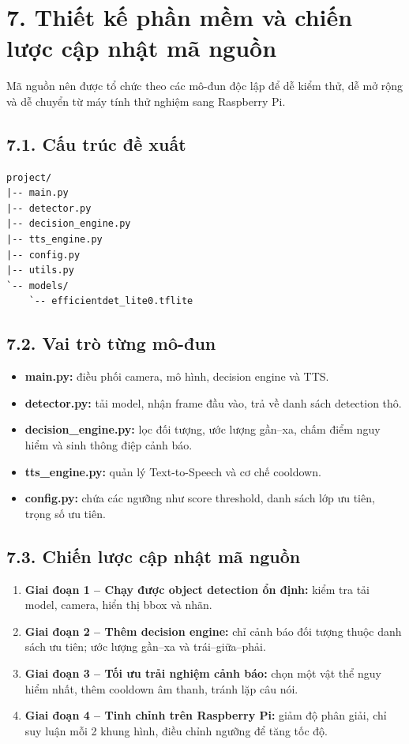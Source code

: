 \documentclass[11pt, a4paper]{article}
\begin{document}
\section*{7. Thiết kế phần mềm và chiến lược cập nhật mã nguồn}
Mã nguồn nên được tổ chức theo các mô-đun độc lập để dễ kiểm thử, dễ mở rộng và dễ chuyển từ máy tính thử nghiệm sang Raspberry Pi.

\subsection*{7.1. Cấu trúc đề xuất}
\begin{verbatim}
project/
|-- main.py
|-- detector.py
|-- decision_engine.py
|-- tts_engine.py
|-- config.py
|-- utils.py
`-- models/
    `-- efficientdet_lite0.tflite
\end{verbatim}

\subsection*{7.2. Vai trò từng mô-đun}
\begin{itemize}
    \item \textbf{main.py:} điều phối camera, mô hình, decision engine và TTS.
    \item \textbf{detector.py:} tải model, nhận frame đầu vào, trả về danh sách detection thô.
    \item \textbf{decision\_engine.py:} lọc đối tượng, ước lượng gần--xa, chấm điểm nguy hiểm và sinh thông điệp cảnh báo.
    \item \textbf{tts\_engine.py:} quản lý Text-to-Speech và cơ chế cooldown.
    \item \textbf{config.py:} chứa các ngưỡng như score threshold, danh sách lớp ưu tiên, trọng số ưu tiên.
\end{itemize}

\subsection*{7.3. Chiến lược cập nhật mã nguồn}
\begin{enumerate}[itemsep=3pt]
    \item \textbf{Giai đoạn 1 -- Chạy được object detection ổn định:} kiểm tra tải model, camera, hiển thị bbox và nhãn.
    \item \textbf{Giai đoạn 2 -- Thêm decision engine:} chỉ cảnh báo đối tượng thuộc danh sách ưu tiên; ước lượng gần--xa và trái--giữa--phải.
    \item \textbf{Giai đoạn 3 -- Tối ưu trải nghiệm cảnh báo:} chọn một vật thể nguy hiểm nhất, thêm cooldown âm thanh, tránh lặp câu nói.
    \item \textbf{Giai đoạn 4 -- Tinh chỉnh trên Raspberry Pi:} giảm độ phân giải, chỉ suy luận mỗi 2 khung hình, điều chỉnh ngưỡng để tăng tốc độ.
\end{enumerate}
\end{document}

